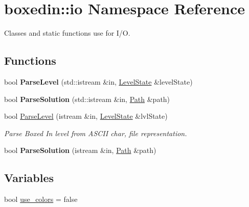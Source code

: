 \hypertarget{namespaceboxedin_1_1io}{\section{boxedin\+:\+:io Namespace Reference}
\label{namespaceboxedin_1_1io}
}


Classes and static functions use for I/\+O.  


\subsection*{Functions}
\begin{DoxyCompactItemize}
\item 
\hypertarget{namespaceboxedin_1_1io_a510f6cf1cd3ae784a4c719affbfe18d3}{bool {\bfseries Parse\+Level} (std\+::istream \&in, \hyperlink{classboxedin_1_1LevelState}{Level\+State} \&level\+State)}\label{namespaceboxedin_1_1io_a510f6cf1cd3ae784a4c719affbfe18d3}

\item 
\hypertarget{namespaceboxedin_1_1io_a83fcb4ddd9a88d7931d0f68edba8a58f}{bool {\bfseries Parse\+Solution} (std\+::istream \&in, \hyperlink{namespaceboxedin_ab79d3e8d943aa2875e3adb42b8917ff7}{Path} \&path)}\label{namespaceboxedin_1_1io_a83fcb4ddd9a88d7931d0f68edba8a58f}

\item 
bool \hyperlink{namespaceboxedin_1_1io_a468cc777de0eddc11c949120332bce85}{Parse\+Level} (istream \&in, \hyperlink{classboxedin_1_1LevelState}{Level\+State} \&lvl\+State)
\begin{DoxyCompactList}\small\item\em Parse Boxed In level from A\+S\+C\+I\+I char, file representation. \end{DoxyCompactList}\item 
\hypertarget{namespaceboxedin_1_1io_ab3635f32bf86a73840bb9261fee01b7b}{bool {\bfseries Parse\+Solution} (istream \&in, \hyperlink{namespaceboxedin_ab79d3e8d943aa2875e3adb42b8917ff7}{Path} \&path)}\label{namespaceboxedin_1_1io_ab3635f32bf86a73840bb9261fee01b7b}

\end{DoxyCompactItemize}
\subsection*{Variables}
\begin{DoxyCompactItemize}
\item 
bool \hyperlink{namespaceboxedin_1_1io_a583d60fa101a5ac52ee13b54b3ca9693}{use\+\_\+colors} = false
\end{DoxyCompactItemize}


